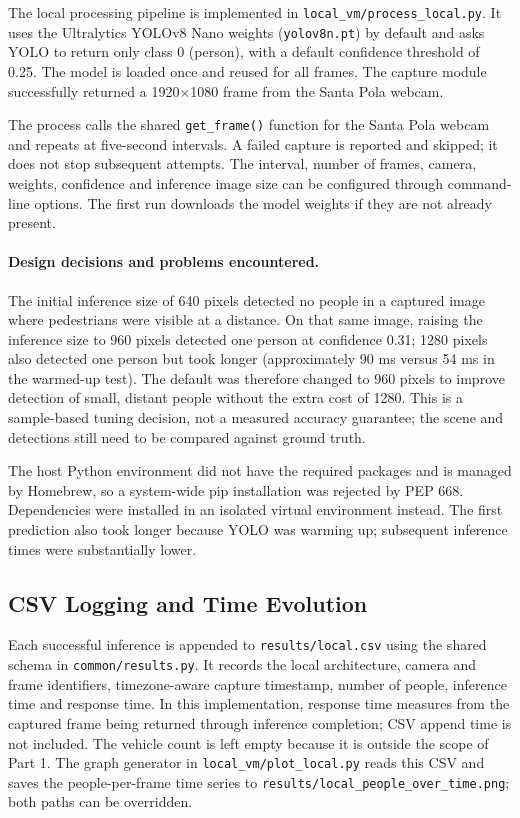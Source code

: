 \documentclass{article}
\begin{document}
    The local processing pipeline is implemented in \texttt{local\_vm/process\_local.py}. It uses the Ultralytics YOLOv8 Nano weights (\texttt{yolov8n.pt}) by default and asks YOLO to return only class 0 (person), with a default confidence threshold of 0.25. The model is loaded once and reused for all frames. The capture module successfully returned a 1920$\times$1080 frame from the Santa Pola webcam.

    The process calls the shared \texttt{get\_frame()} function for the Santa Pola webcam and repeats at five-second intervals. A failed capture is reported and skipped; it does not stop subsequent attempts. The interval, number of frames, camera, weights, confidence and inference image size can be configured through command-line options. The first run downloads the model weights if they are not already present.

    \paragraph{Design decisions and problems encountered.}
    The initial inference size of 640 pixels detected no people in a captured image where pedestrians were visible at a distance. On that same image, raising the inference size to 960 pixels detected one person at confidence 0.31; 1280 pixels also detected one person but took longer (approximately 90 ms versus 54 ms in the warmed-up test). The default was therefore changed to 960 pixels to improve detection of small, distant people without the extra cost of 1280. This is a sample-based tuning decision, not a measured accuracy guarantee; the scene and detections still need to be compared against ground truth.

    The host Python environment did not have the required packages and is managed by Homebrew, so a system-wide pip installation was rejected by PEP 668. Dependencies were installed in an isolated virtual environment instead. The first prediction also took longer because YOLO was warming up; subsequent inference times were substantially lower.

    \subsection{CSV Logging and Time Evolution}

    Each successful inference is appended to \texttt{results/local.csv} using the shared schema in \texttt{common/results.py}. It records the local architecture, camera and frame identifiers, timezone-aware capture timestamp, number of people, inference time and response time. In this implementation, response time measures from the captured frame being returned through inference completion; CSV append time is not included. The vehicle count is left empty because it is outside the scope of Part 1. The graph generator in \texttt{local\_vm/plot\_local.py} reads this CSV and saves the people-per-frame time series to \texttt{results/local\_people\_over\_time.png}; both paths can be overridden.
\end{document}
